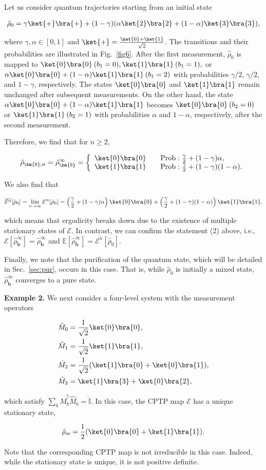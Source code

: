 \documentclass[preprint,pteplogo]{ptephy_v2}%
\numberwithin{equation}{section}
\theoremstyle{definition}
\newcommand{\av}[1]{\overline{#1}}
\newcommand{\ml}[1]{\mathcal{#1}}
\newcommand{\mr}[1]{\mathrm{#1}}
\newcommand{\mbb}[1]{\mathbb{#1}}
\newcommand{\ketbra}[1]{\ket{#1}\bra{#1}}
\newcommand{\lrs}[1]{\left( #1 \right)}
\newcommand{\aln}[1]{
\begin{align}
#1
\end{align}
}
\newcommand{\ra}{\rightarrow}
\begin{document}
Let us consider quantum trajectories starting from an initial state
\aln{\label{inifour}
\hat{\rho}_0=\gamma\ket{+}\bra{+}+(1-\gamma)(\alpha\ket{2}\bra{2}+(1-\alpha)\ket{3}\bra{3}),
}
where $\gamma,\alpha\in [0,1]$ and $\ket{+}=\frac{\ket{0}+\ket{1}}{\sqrt{2}}$.
The transitions and their probabilities are illustrated in Fig.~\ref{fig6}.
After the first measurement, $\hat{\rho}_0$ is mapped to $\ketbra{0}\: (b_1=0), \ketbra{1} \:(b_1=1),$ or $\alpha\ketbra{0}+(1-\alpha)\ketbra{1}\:(b_1=2)$ with probabilities $\gamma/2$, $\gamma/2$, and $1-\gamma$, respectively.
The states $\ketbra{0}$ and $\ketbra{1}$ remain unchanged after subsequent measurements.
On the other hand, the state $\alpha\ketbra{0}+(1-\alpha)\ketbra{1}$ becomes $\ketbra{0}\:(b_2=0)$ or $\ketbra{1}\:(b_2=1)$ with probabilities $\alpha$ and $1-\alpha$, respectively, after the second measurement.

Therefore, we find that for $n \geq 2$,
\aln{
\hat{\rho}_{\bm{b};n}=\hat{\rho}_{\bm{b}}^\infty=
\left\{
\begin{array}{ll}
\ketbra{0} &\quad \mr{Prob}:\frac{\gamma}{2}+(1-\gamma)\alpha, \\
\ketbra{1} &\quad \mr{Prob}:\frac{\gamma}{2}+(1-\gamma)(1-\alpha).
\end{array}
\right.
}
We also find that
\aln{
\av{\ml{E}^n}[\hat{\rho}_0]=\lim_{n\ra\infty}\ml{E}^n[\hat{\rho}_0]
=\lrs{\frac{\gamma}{2}+(1-\gamma)\alpha}\ketbra{0}+\lrs{\frac{\gamma}{2}+(1-\gamma)(1-\alpha)}{\ketbra{1},
}}
which means that ergodicity breaks down due to the existence of multiple stationary states of $\ml{E}$.
In contrast, we can confirm the statement (2) above, i.e., $\ml{E}[\hat{\rho}_{\bm{b}}^\infty]=\hat{\rho}_{\bm{b}}^\infty$ and 
$\mbb{E}[\hat{\rho}_{\bm{b}}^\infty]=\av{\ml{E}^n}[\hat{\rho}_0]$.

Finally, we note that the purification of the quantum state, which will be detailed in Sec.~\ref{sec:pur}, occurs in this case.
That is, while $\hat{\rho}_0$ is initially a mixed state, $\hat{\rho}_{\bm{b}}^\infty$ converges to a pure state.
\newline


\textbf{Example 2.}
We next consider a four-level system with the measurement operators 
\aln{\label{example2}
\begin{split}
\hat{M}_0&=\frac{1}{\sqrt{2}}\ket{0}\bra{0},\\
\hat{M}_1&=\frac{1}{\sqrt{2}}\ket{1}\bra{1},\\
\hat{M}_2&=\frac{1}{\sqrt{2}}(\ket{1}\bra{0}+\ket{0}\bra{1}),\\
\hat{M}_3&=\ket{1}\bra{3}+\ket{0}\bra{2},
\end{split}}
which satisfy $\sum_b\hat{M}_b^\dag\hat{M}_b=\hat{\mbb{I}}$.
In this case, the CPTP map $\ml{E}$ has a unique stationary state,
\aln{
\hat{\rho}_\mr{ss}=\frac{1}{2}(\ketbra{0}+\ketbra{1}).
}
Note that the corresponding CPTP map is not irreducible in this case.
Indeed, while the stationary state is unique, it is not positive definite.
\end{document}
